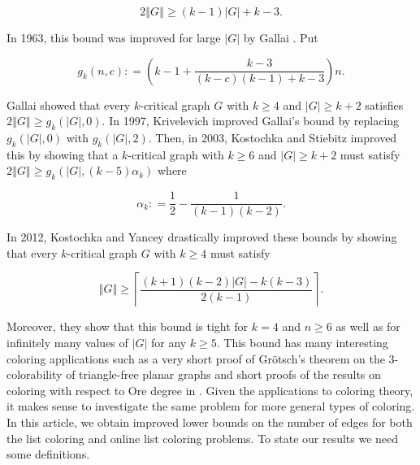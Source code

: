 \documentclass[12pt]{article}
\theoremstyle{plain}
\theoremstyle{definition}
\theoremstyle{remark}
\newcommand{\card}[1]{\left|#1\right|}
\newcommand{\size}[1]{\left\Vert#1\right\Vert}
\newcommand{\ceil}[1]{\left\lceil#1\right\rceil}
\newcommand{\parens}[1]{\left( #1 \right)}
\newcommand{\DefinedAs}{\mathrel{\mathop:}=}
\begin{document}
\[2\size{G} \geq (k-1)\card{G} + k-3.\]

In 1963, this bound was improved for large $\card{G}$ by Gallai \cite{gallai1963kritische}.  Put 

\[g_k(n, c) \DefinedAs \parens{k-1 + \frac{k-3}{(k-c)(k-1) + k-3}}n.\]

Gallai showed that every $k$-critical graph $G$ with $k \geq 4$ and $\card{G} \geq k+2$ satisfies $2\size{G} \geq g_k(\card{G}, 0)$.  In 1997, Krivelevich \cite{krivelevich1997minimal} improved Gallai's bound by replacing $g_k(\card{G}, 0)$ with $g_k(\card{G}, 2)$.  Then, in 2003, Kostochka and Stiebitz \cite{kostochkastiebitzedgesincriticalgraph} improved this by showing that a $k$-critical graph with $k \geq 6$ and $\card{G} \geq k+2$ must satisfy $2\size{G} \geq g_k(\card{G}, (k-5)\alpha_k)$ where

\[\alpha_k \DefinedAs \frac12 - \frac{1}{(k-1)(k-2)}.\]

In 2012, Kostochka and Yancey \cite{kostochkayancey2012ore} drastically improved these bounds by showing that every $k$-critical graph $G$ with $k \geq 4$ must satisfy

\[\size{G} \geq \ceil{\frac{(k+1)(k-2)\card{G} - k(k-3)}{2(k-1)}}.\]

Moreover, they show that this bound is tight for $k=4$ and $n \geq 6$ as well as for infinitely many values of $\card{G}$ for any $k \geq 5$.  This bound has many interesting coloring applications such as a very short proof of Gr\"otsch's theorem on the $3$-colorability of triangle-free planar graphs \cite{kostochka2012oregrotsch} and short proofs of the results on coloring with respect to Ore degree in \cite{kierstead2009ore, rabern2010a, krs_one}.  Given the applications to coloring theory, it makes sense to investigate the same problem for more general types of coloring.  In this article, we obtain improved lower bounds on the number of edges for both the list coloring and online list coloring problems.  To state our results we need some definitions.
\end{document}

